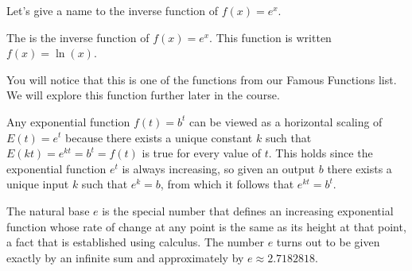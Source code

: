 \documentclass[nooutcomes]{ximera}
\begin{document}
Let's give a name to the inverse function of $f(x)=e^x$.

\begin{definition}
The  is the inverse function of $f(x)=e^x$.  This function is written $f(x)=\ln(x)$.
\end{definition}

You will notice that this is one of the functions from our Famous Functions list.  We will explore this function further later in the course.

\begin{summary}
\item Any exponential function \(f(t) = b^t\) can be viewed as a horizontal scaling of \(E(t) = e^t\) because there exists a unique constant \(k\) such that \(E(kt) = e^{kt} = b^t = f(t)\) is true for every value of \(t\).  This holds since the exponential function \(e^t\) is always increasing, so given an output \(b\) there exists a unique input \(k\) such that \(e^k = b\), from which it follows that \(e^{kt} = b^t\).
\item The natural base \(e\) is the special number that defines an increasing exponential function whose rate of change at any point is the same as its height at that point, a fact that is established using calculus.  The number \(e\) turns out to be given exactly by an infinite sum and approximately by \(e \approx 2.7182818\).
\end{summary}
\end{document}
